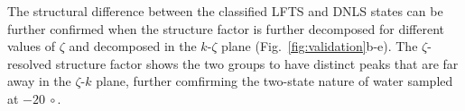 \documentclass[aps, amsmath,amssymb, reprint, twocolumn, superscriptaddress]{revtex4-2}
\newcommand{\comment}[1]{\textcolor{Mahogany}{#1}}
\newcommand{\edit}[1]{\textcolor{OrangeRed}{#1}}
\begin{document}


The structural difference between the classified LFTS and DNLS states can be further confirmed when the structure factor is further decomposed for different values of $\zeta$ and decomposed in the $k$-$\zeta$ plane (Fig.~\ref{fig:validation}b-e). The $\zeta$-resolved structure factor shows the two groups to have distinct peaks that are far away in the $\zeta$-$k$ plane, further comfirming the two-state nature of water sampled at $-20~\circ$.
\end{document}
